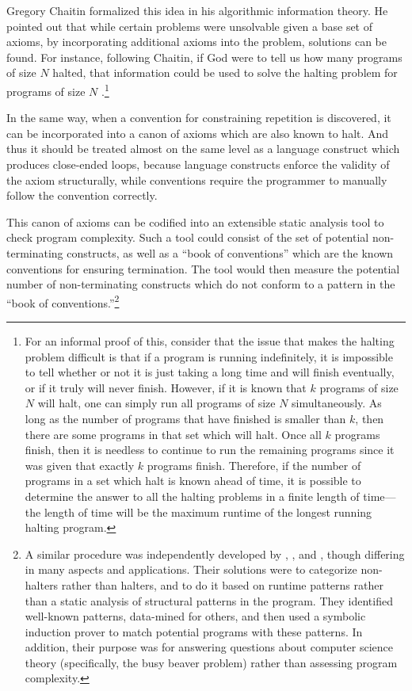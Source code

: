 Gregory Chaitin formalized this idea in his algorithmic information theory.  He pointed out that while certain problems were unsolvable given a base set of axioms, by incorporating additional axioms into the problem, solutions can be found.  For instance, following Chaitin, if God were to tell us how many programs of size $N$ halted, that information could be used to solve the halting problem for programs of size $N$ \citep{chaitin}.\footnote{For an informal proof of this, consider that the issue that makes the halting problem difficult is that if a program is running indefinitely, it is impossible to tell whether or not it is just taking a long time and will finish eventually, or if it truly will never finish.   However, if it is known that $k$ programs of size $N$ will halt, one can simply run all programs of size $N$ simultaneously.  As long as the number of programs that have finished is smaller than $k$, then there are some programs in that set which will halt.  Once all $k$ programs finish, then it is needless to continue to run the remaining programs since it was given that exactly $k$ programs finish.  Therefore, if the number of programs in a set which halt is known ahead of time, it is possible to determine the answer to all the halting problems in a finite length of time---the length of time will be the maximum runtime of the longest running halting program.}

In the same way, when a convention for constraining repetition is discovered, it can be incorporated into a canon of axioms which are also known to halt.  And thus it should be treated almost on the same level as a language construct which produces close-ended loops, because language constructs enforce the validity of the axiom structurally, while conventions require the programmer to manually follow the convention correctly.

This canon of axioms can be codified into an extensible static analysis tool to check program complexity.  Such a tool could consist of the set of potential non-terminating constructs, as well as a ``book of conventions'' which are the known conventions for ensuring termination.  The tool would then measure the potential number of non-terminating constructs which do not conform to a pattern in the ``book of conventions.''\footnote{A similar procedure was independently developed by \citet{bringsjord}, \citet{hertel}, and \citet{harland}, though differing in many aspects and applications.  Their solutions were to categorize non-halters rather than halters, and to do it based on runtime patterns rather than a static analysis of structural patterns in the program.  They identified well-known patterns, data-mined for others, and then used a symbolic induction prover to match potential programs with these patterns. In addition, their purpose was for answering questions about computer science theory (specifically, the busy beaver problem) rather than assessing program complexity.}

